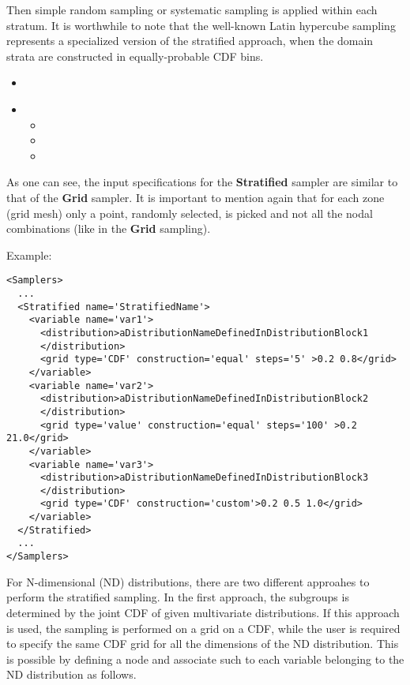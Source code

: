 Then simple random sampling or systematic sampling is applied within each
stratum.
%
It is worthwhile to note that the well-known Latin hypercube sampling represents
a specialized version of the stratified approach, when the domain strata are
constructed in equally-probable CDF bins.

%
\attrIntro
\begin{itemize}
\itemsep0em
\item \nameDescription
\end{itemize}
\begin{itemize}
\item \variableDescription
 \variableChildrenIntro
 \begin{itemize}
    \item \distributionDescription
    \item \functionDescription
    \item \gridDescription
  \end{itemize}
\end{itemize}

As one can see, the input specifications for the \textbf{Stratified} sampler are
similar to that of the \textbf{Grid} sampler.
%
It is important to mention again that for each zone (grid mesh) only a point,
randomly selected, is picked and not all the nodal combinations (like in the
\textbf{Grid} sampling).


Example:
\begin{lstlisting}[style=XML,morekeywords={construction,steps,lowerBound,upperBound}]
<Samplers>
  ...
  <Stratified name='StratifiedName'>
    <variable name='var1'>
      <distribution>aDistributionNameDefinedInDistributionBlock1
      </distribution>
      <grid type='CDF' construction='equal' steps='5' >0.2 0.8</grid>
    </variable>
    <variable name='var2'>
      <distribution>aDistributionNameDefinedInDistributionBlock2
      </distribution>
      <grid type='value' construction='equal' steps='100' >0.2 21.0</grid>
    </variable>
    <variable name='var3'>
      <distribution>aDistributionNameDefinedInDistributionBlock3
      </distribution>
      <grid type='CDF' construction='custom'>0.2 0.5 1.0</grid>
    </variable>
  </Stratified>
  ...
</Samplers>
\end{lstlisting}

For N-dimensional  (ND) distributions, there are two different approahes to perform the stratified sampling. In the first approach, 
the subgroups is determined by the joint CDF of given multivariate distributions. If this approach is used, the sampling is performed 
on a grid on a CDF, while the user is required to specify the same CDF grid for all the dimensions of the ND distribution.
This is possible by defining a  node and associate such  to each variable belonging to the 
ND distribution as follows.

